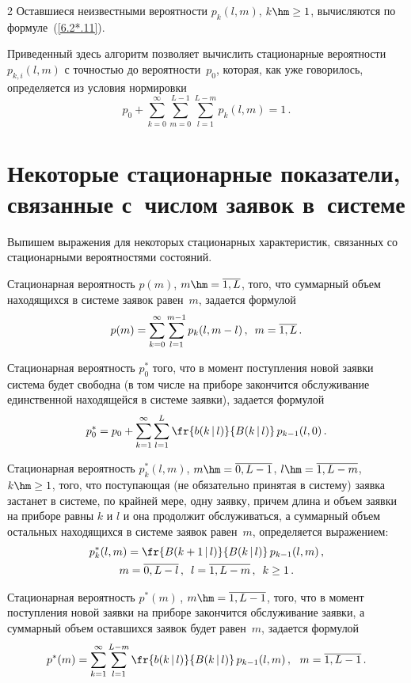 \begin{multicols}{2}
Оставшиеся неизвестными вероятности $p_{k}(l,m)$,
$k\hm\ge1$, вычисляются по формуле~(\ref{6.2*.11}).

Приведенный здесь алгоритм позволяет вы\-чис\-лить
стационарные вероятности $p_{k,i}(l,m)$ с точ\-ностью
до вероятности~$p_0$, которая, как уже говорилось,
определяется из условия нормировки
$$
p_0+ \sum\limits_{k=0}^{\infty} \sum\limits_{m=0}^{L-1}
\sum\limits_{l=1}^{L-m} p_{k}(l,m)
= 1 \,.
$$

\section{Некоторые стационарные показатели,
связанные с~числом заявок в~системе}

Выпишем выражения для некоторых стационарных
характеристик, связанных со стационарными
вероятностями со\-сто\-яний.

Стационарная вероятность $p(m)$, $m\hm= \overline{1,L}$,
того, что суммарный объем находящихся в сис\-те\-ме заявок
равен~$m$, задается формулой
\begin{equation*}
p(m)= \sum\limits_{k=0}^{\infty} \sum\limits_{l=1}^{m-1}
p_{k}(l,m-l)\,,
\enskip m= \overline{1,L}\,.
\end{equation*}

Стационарная вероятность $p^*_{0}$ того, что в момент
поступления новой заявки система будет свободна (в том
числе на приборе закончится обслуживание единственной
находящейся в сис\-те\-ме заявки), задается формулой
\begin{equation*}
p^*_{0} = p_0 + \sum\limits_{k=1}^\infty \sum\limits_{l=1}^{L}
\fr{b(k\,|\,l)}{ B(k\,|\,l)} \, p_{k-1}(l,0) \,.
\end{equation*}

Стационарная вероятность
$p^*_{k}(l,m)$, $m\hm= \overline{0,L-1}$,
$l\hm= \overline{1,L-m}$, $k\hm\ge 1$,
того, что поступающая (не обязательно принятая в сис\-те\-му)
заявка застанет в сис\-те\-ме, по крайней мере, одну заявку,
причем длина и объем заявки на приборе равны $k$ и $l$
и она продолжит обслуживаться, а суммарный
объем остальных находящихся в сис\-те\-ме заявок равен~$m$,
определяется выражением:
\begin{multline*}
p^*_{k}(l,m)= \fr{B(k+1\,|\,l)}{B(k\,|\,l)}
\, p_{k-1}(l,m)\,,\\
m= \overline{0,L-l}\,,
\enskip
 l= \overline{1,L-m}\,,
\enskip  k\ge 1\,.
\end{multline*}

Стационарная вероятность
$p^*(m)$\,, $m\hm= \overline{1,L-1}$,
того, что в момент поступления новой заявки на приборе
закончится обслуживание заявки, а суммарный объем
оставшихся заявок будет равен~$m$, задается формулой
\begin{equation*}
p^*(m)= \sum\limits_{k=1}^\infty \sum\limits_{l=1}^{L-m}
\fr{b(k\,|\,l)}{ B(k\,|\,l)} \, p_{k-1}(l,m)\,,
\ \ m= \overline{1,L-1}\,.
\end{equation*}


\end{multicols}
